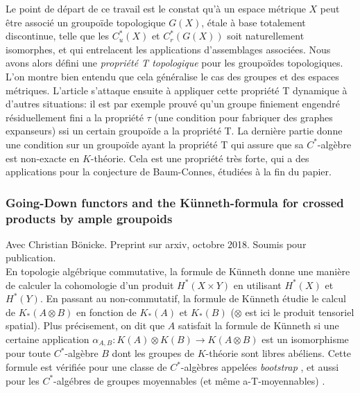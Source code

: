 \documentclass[a4paper,11pt]{article}
\begin{document}
Le point de d\'epart de ce travail est le constat qu'\`a un espace m\'etrique $X$ peut \^etre associ\'e un groupo\"ide topologique $G(X)$, \'etale \`a base totalement discontinue, telle que les $C^*_u(X)$ et $C_r^*(G(X))$ soit naturellement isomorphes, et qui entrelacent les applications d'assemblages associ\'ees. Nous avons alors d\'efini une \textit{propri\'et\'e T topologique} pour les groupo\"ides topologiques. L'on montre bien entendu que cela g\'en\'eralise le cas des groupes et des espaces m\'etriques. L'article s'attaque ensuite \`a appliquer cette propri\'et\'e T dynamique \`a d'autres situations: il est par exemple prouv\'e qu'un groupe finiement engendr\'e r\'esiduellement fini a la propri\'et\'e $\tau$ (une condition pour fabriquer des graphes expanseurs) ssi un certain groupo\"ide a la propri\'et\'e T. La derni\`ere partie donne une condition sur un groupo\"ide ayant la propri\'et\'e T qui assure que sa $C^*$-alg\`ebre est non-exacte en $K$-th\'eorie. Cela est une propri\'et\'e tr\`es forte, qui a des applications pour la conjecture de Baum-Connes, \'etudi\'ees \`a la fin du papier. 

\subsubsection*{Going-Down functors and the Künneth-formula for crossed products by ample groupoids} Avec Christian Bönicke. Preprint sur arxiv, octobre 2018. Soumis pour publication.\\

En topologie alg\'ebrique commutative, la formule de K\"unneth donne une mani\`ere de calculer la cohomologie d'un produit $H^*(X\times Y)$ en utilisant $H^*(X)$ et $H^*(Y)$. En passant au non-commutatif, la formule de K\"unneth \'etudie le calcul de $K_*(A \otimes B)$ en fonction de $K_*(A)$ et $K_*(B)$ ($\otimes$ est ici le produit tensoriel spatial). Plus pr\'ecisement, on dit que $A$ satisfait la formule de K\"unneth si une certaine application $\alpha_{A,B}: K(A)\otimes K(B) \rightarrow K(A\otimes B)$ est un isomorphisme pour toute $C^*$-alg\`ebre $B$ dont les groupes de $K$-th\'eorie sont libres ab\'eliens. Cette formule est v\'erifi\'ee pour une classe de $C^*$-alg\`ebres appel\'ees \textit{bootstrap} \cite{rosenberg1987kunneth}, et aussi pour les $C^*$-alg\'ebres de groupes moyennables (et m\^eme a-T-moyennables) \cite{BaumConnesHigson}\cite{TuThese}. \\
\end{document}
